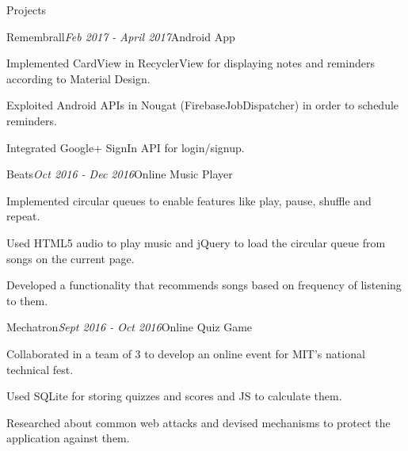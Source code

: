 \documentclass{resume} %
\begin{document}
\begin{rSection}{Projects}
\begin{rSubsection}{Remembrall}{\em Feb 2017 - April 2017}{Android App}{}
  \item Implemented CardView in RecyclerView for displaying notes and reminders according to Material Design.
  \item Exploited Android APIs in Nougat (FirebaseJobDispatcher) in order to schedule reminders.
  \item Integrated Google+ SignIn API for login/signup.
 \end{rSubsection}
 
\begin{rSubsection}{Beats}{\em Oct 2016 - Dec 2016}{Online Music Player}{}
  \item Implemented circular queues to enable features like play, pause, shuffle and repeat.
  \item Used HTML5 audio to play music and jQuery to load the circular queue from songs on the current page.
  \item Developed a functionality that recommends songs based on frequency of listening to them.
\end{rSubsection}
\begin{rSubsection}{Mechatron}{\em Sept 2016 - Oct 2016}{Online Quiz Game}{}
  \item Collaborated in a team of 3 to develop an online event for MIT's national technical fest.
  \item Used SQLite for storing quizzes and scores and JS to calculate them.
  \item Researched about common web attacks and devised mechanisms to protect the application against them.
\end{rSubsection}
\end{rSection}
\end{document}
